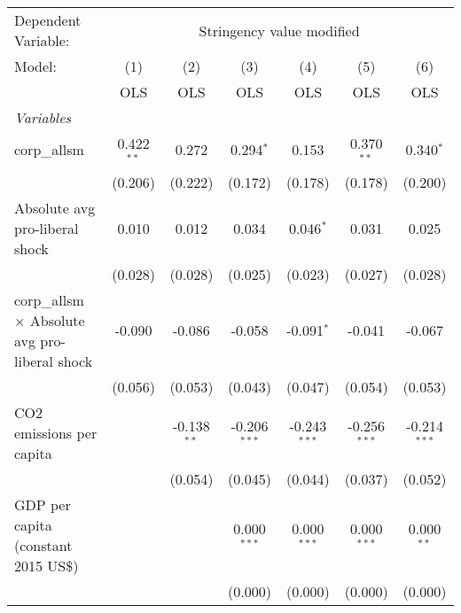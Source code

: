 
\begingroup
\centering
\begin{tabular}{lcccccc}
   \toprule
   Dependent Variable: & \multicolumn{6}{c}{Stringency value modified}\\
   Model:                                                & (1)          & (2)           & (3)            & (4)            & (5)            & (6)\\  
                                                         &  OLS         & OLS           & OLS            & OLS            & OLS            & OLS\\  
   \midrule
   \emph{Variables}\\
   corp\_allsm                                           & 0.422$^{**}$ & 0.272         & 0.294$^{*}$    & 0.153          & 0.370$^{**}$   & 0.340$^{*}$\\   
                                                         & (0.206)      & (0.222)       & (0.172)        & (0.178)        & (0.178)        & (0.200)\\   
   Absolute avg pro-liberal shock                        & 0.010        & 0.012         & 0.034          & 0.046$^{*}$    & 0.031          & 0.025\\   
                                                         & (0.028)      & (0.028)       & (0.025)        & (0.023)        & (0.027)        & (0.028)\\   
   corp\_allsm $\times$ Absolute avg pro-liberal shock   & -0.090       & -0.086        & -0.058         & -0.091$^{*}$   & -0.041         & -0.067\\   
                                                         & (0.056)      & (0.053)       & (0.043)        & (0.047)        & (0.054)        & (0.053)\\   
   CO2 emissions per capita                              &              & -0.138$^{**}$ & -0.206$^{***}$ & -0.243$^{***}$ & -0.256$^{***}$ & -0.214$^{***}$\\   
                                                         &              & (0.054)       & (0.045)        & (0.044)        & (0.037)        & (0.052)\\   
   GDP per capita (constant 2015 US\$)                   &              &               & 0.000$^{***}$  & 0.000$^{***}$  & 0.000$^{***}$  & 0.000$^{**}$\\   
                                                         &              &               & (0.000)        & (0.000)        & (0.000)        & (0.000)\\   

\end{tabular}
